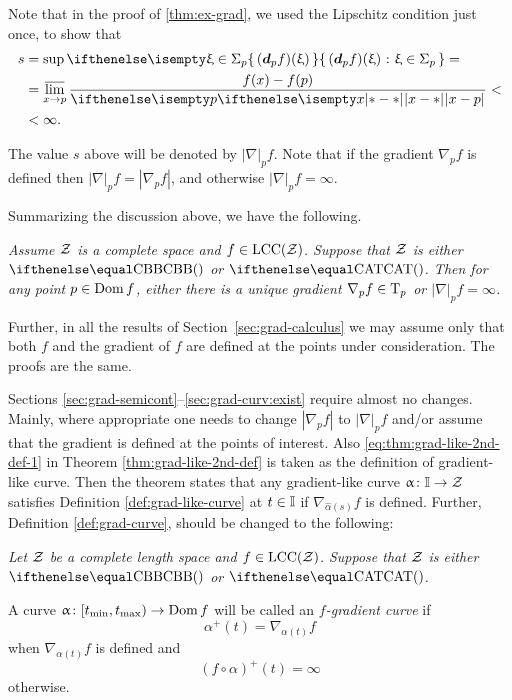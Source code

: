 Note that in the proof of \ref{thm:ex-grad}, 
we used the Lipschitz condition just once,
to show that 
\begin{align*}
s&=\sup\set{(\dd_p f)(\xi)}{\xi\in\Sigma_p}=
\\
&=\limsup_{x\to p}\frac{f(x)-f(p)}{\dist{x}{p}{}}<
\\
&<\infty.
\end{align*}


The value $s$ above will be denoted by $|\nabla|_pf$.
Note that 
if the gradient $\nabla_pf$ is defined then $|\nabla|_pf=|\nabla_pf|$,
and otherwise $|\nabla|_pf=\infty$.

Summarizing the discussion above, 
we have the following.

\textit{Assume $\mathcal{Z}$ is a complete space and $f\in \LSCSC(\spc{Z})$. 
Suppose that $\mathcal{Z}$ is either $\Alex{}$ or $\CAT{}$.
Then for any point $p\in \Dom f$, either there is a unique gradient $\nabla_p f\in \T_p$ 
or $|\nabla|_pf=\infty$.}

\medskip

Further, in all the results of Section~\ref{sec:grad-calculus} 
we may assume only that both $f$ and the gradient of $f$ are defined at the points under consideration. The proofs are the same.

Sections \ref{sec:grad-semicont}--\ref{sec:grad-curv:exist}
require almost no changes.
Mainly, where appropriate
one needs to change $|\nabla_p f|$ 
to $|\nabla|_pf$ 
and/or assume that the gradient is defined at the points of interest.
Also  \ref{eq:thm:grad-like-2nd-def-1} in Theorem \ref{thm:grad-like-2nd-def}
is taken as the definition of gradient-like curve.
Then the theorem states that any  gradient-like curve $\alpha\:\II\to\spc{Z}$ satisfies Definition \ref{def:grad-like-curve} at $t\in \II$ if $\nabla_{\hat\alpha(s)} f$ is defined.
Further, Definition \ref{def:grad-curve}, should be changed to the following:

\medskip

{\it Let $\mathcal{Z}$ be a complete length space
and $f\in\LSCSC(\spc{Z})$.
Suppose that $\mathcal{Z}$ is either $\Alex{}$ or $\CAT{}$.

A curve 
$\alpha\:[t_{\min},t_{\max})\to\Dom f$ will be called an  \emph{$f$-gradient curve} if
\[\alpha^+(t)=\nabla_{\alpha(t)} f\]
when $\nabla_{\alpha(t)} f$ is defined and 
\[(f\circ\alpha)^+(t)=\infty\]
otherwise.}

